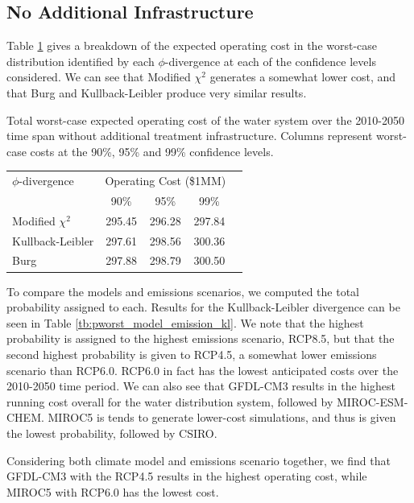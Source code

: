 \documentclass[opre,nonblindrev]{informs3} %
\begin{document}
\subsection{No Additional Infrastructure}

Table \ref{tb:total_cost_no_infrastructure} gives a breakdown of the expected operating cost in the worst-case distribution identified by each $\phi$-divergence at each of the confidence levels considered.
We can see that Modified $\chi^2$ generates a somewhat lower cost, and that Burg and Kullback-Leibler produce very similar results.

\begin{table}
	\TABLE
	{
		Total worst-case expected operating cost of the water system over the 2010-2050 time span without additional treatment infrastructure.
		Columns represent worst-case costs at the 90\%, 95\% and 99\% confidence levels.
		\label{tb:total_cost_no_infrastructure}
	}
	{\begin{tabular}{l|cccc}
		$\phi$-divergence & \multicolumn{3}{c}{Operating Cost (\$1MM)} \\
								& 90\%   & 95\%   & 99\% \\
		\hline
		Modified $\chi^2$ & 295.45 & 296.28 & 297.84 \\
		Kullback-Leibler  & 297.61 & 298.56 & 300.36 \\
		Burg              & 297.88 & 298.79 & 300.50
	 \end{tabular}}
	{}
\end{table}

To compare the models and emissions scenarios, we computed the total probability assigned to each.
Results for the Kullback-Leibler divergence can be seen in Table \ref{tb:pworst_model_emission_kl}.
We note that the highest probability is assigned to the highest emissions scenario, RCP8.5, but that the second highest probability is given to RCP4.5, a somewhat lower emissions scenario than RCP6.0.
RCP6.0 in fact has the lowest anticipated costs over the 2010-2050 time period.
We can also see that GFDL-CM3 results in the highest running cost overall for the water distribution system, followed by MIROC-ESM-CHEM.
MIROC5 is tends to generate lower-cost simulations, and thus is given the lowest probability, followed by CSIRO.

Considering both climate model and emissions scenario together, we find that GFDL-CM3 with the RCP4.5 results in the highest operating cost, while MIROC5 with RCP6.0 has the lowest cost.
\end{document}
